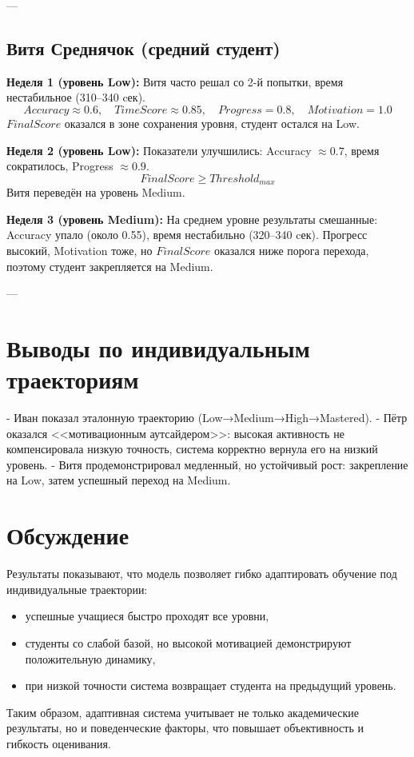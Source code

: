 \documentclass[12pt,a4paper]{article}
\begin{document}
---

\subsection{Витя Среднячок (средний студент)}
\textbf{Неделя 1 (уровень Low):}  
Витя часто решал со 2-й попытки, время нестабильное (310–340 cек).  
\[
Accuracy \approx 0.6, \quad TimeScore \approx 0.85, \quad Progress = 0.8, \quad Motivation = 1.0
\]
$FinalScore$ оказался в зоне сохранения уровня, студент остался на Low.  

\textbf{Неделя 2 (уровень Low):}  
Показатели улучшились: Accuracy $\approx 0.7$, время сократилось, Progress $\approx 0.9$.  
\[
FinalScore \geq Threshold_{max}
\]
Витя переведён на уровень Medium.  

\textbf{Неделя 3 (уровень Medium):}  
На среднем уровне результаты смешанные: Accuracy упало (около 0.55), время нестабильно (320–340 cек).  
Прогресс высокий, Motivation тоже, но $FinalScore$ оказался ниже порога перехода, поэтому студент закрепляется на Medium.  

---

\section{Выводы по индивидуальным траекториям}
- Иван показал эталонную траекторию (Low→Medium→High→Mastered).  
- Пётр оказался <<мотивационным аутсайдером>>: высокая активность не компенсировала низкую точность, система корректно вернула его на низкий уровень.  
- Витя продемонстрировал медленный, но устойчивый рост: закрепление на Low, затем успешный переход на Medium.  


\section{Обсуждение}
Результаты показывают, что модель позволяет гибко адаптировать обучение под индивидуальные траектории:
\begin{itemize}
    \item успешные учащиеся быстро проходят все уровни,
    \item студенты со слабой базой, но высокой мотивацией демонстрируют положительную динамику,
    \item при низкой точности система возвращает студента на предыдущий уровень.
\end{itemize}

Таким образом, адаптивная система учитывает не только академические результаты, но и поведенческие факторы, что повышает объективность и гибкость оценивания.
\end{document}
